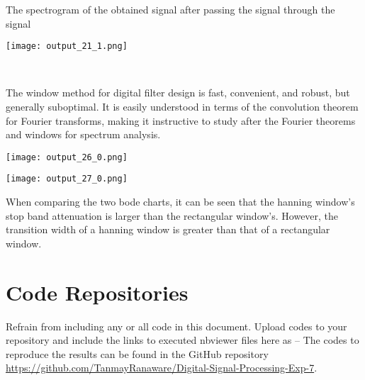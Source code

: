 \documentclass[12pt, a4 paper]{article}
\begin{document}
The spectrogram of the obtained signal after passing the signal through the signal

\begin{center}
    \begin{wrapfigure}
    \centering
    \texttt{[image: output\_21\_1.png]}
    \end{wrapfigure}
\end{center}

\\

\solution

The window method for digital filter design is fast, convenient, and robust, but generally suboptimal. It is easily understood in terms of the convolution theorem for Fourier transforms, making it instructive to study after the Fourier theorems and windows for spectrum analysis. 

\begin{center}
    \begin{wrapfigure}
    \centering
    \texttt{[image: output\_26\_0.png]}
    \end{wrapfigure}
\end{center}


\begin{center}
    \begin{wrapfigure}
    \centering
    \texttt{[image: output\_27\_0.png]}
    \end{wrapfigure}
\end{center}

When comparing the two bode charts, it can be seen that the hanning window's stop band attenuation is larger than the rectangular window's. However, the transition width of a hanning window is greater than that of a rectangular window.


\appendix
\section{Code Repositories}
Refrain from including any or all code in this document. Upload codes to your repository and include the links to executed nbviewer files here as -- The codes to reproduce the results can be found in the GitHub repository \url{https://github.com/TanmayRanaware/Digital-Signal-Processing-Exp-7}.
\end{document}
